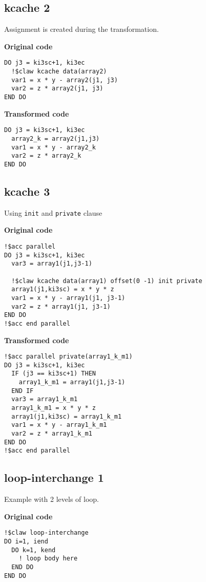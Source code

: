 \documentclass{article}
\begin{document}
\subsection{kcache 2}
\label{kcache2}
Assignment is created during the transformation. 

\textbf{Original code}
\begin{lstlisting}
DO j3 = ki3sc+1, ki3ec
  !$claw kcache data(array2)
  var1 = x * y - array2(j1, j3)
  var2 = z * array2(j1, j3)
END DO
\end{lstlisting}


\textbf{Transformed code}
\begin{lstlisting}
DO j3 = ki3sc+1, ki3ec
  array2_k = array2(j1,j3)
  var1 = x * y - array2_k
  var2 = z * array2_k
END DO
\end{lstlisting}

\subsection{kcache 3}
\label{kcache3}
Using \lstinline!init! and \lstinline!private! clause

\textbf{Original code}
\begin{lstlisting}
!$acc parallel
DO j3 = ki3sc+1, ki3ec
  var3 = array1(j1,j3-1)

  !$claw kcache data(array1) offset(0 -1) init private
  array1(j1,ki3sc) = x * y * z
  var1 = x * y - array1(j1, j3-1)
  var2 = z * array1(j1, j3-1)
END DO
!$acc end parallel
\end{lstlisting}


\textbf{Transformed code}
\begin{lstlisting}
!$acc parallel private(array1_k_m1)
DO j3 = ki3sc+1, ki3ec
  IF (j3 == ki3sc+1) THEN
    array1_k_m1 = array1(j1,j3-1)
  END IF
  var3 = array1_k_m1
  array1_k_m1 = x * y * z
  array1(j1,ki3sc) = array1_k_m1
  var1 = x * y - array1_k_m1
  var2 = z * array1_k_m1
END DO
!$acc end parallel
\end{lstlisting}


\subsection{loop-interchange 1}
\label{loop-interchange1}
Example with 2 levels of loop. 

\textbf{Original code}
\begin{lstlisting}
!$claw loop-interchange
DO i=1, iend
  DO k=1, kend
    ! loop body here
  END DO
END DO
\end{lstlisting}
\end{document}
